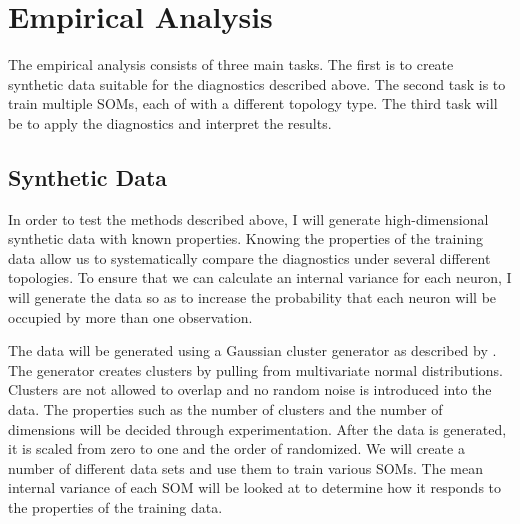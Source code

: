 \section{Empirical Analysis}
The empirical analysis consists of three main tasks.  The first is to create
synthetic data suitable for the diagnostics described above.  The second task is
to train multiple SOMs, each of with a different topology type. The third task
will be to apply the diagnostics and interpret the results.

\subsection{Synthetic Data}
In order to test the methods described above, I will generate high-dimensional
synthetic data with known properties.  Knowing the properties of the training
data allow us to systematically compare the diagnostics under several different
topologies.  To ensure that we can calculate an internal variance for each
neuron, I will generate the data so as to increase the probability that each
neuron will be occupied by more than one observation.

The data will be generated using a Gaussian cluster generator as described by
\cite{handl}. The generator creates clusters by pulling from multivariate
normal distributions.  Clusters are not allowed to overlap and no random noise
is introduced into the data.  The properties such as the number of clusters
and the number of dimensions will be decided through experimentation.  After
the data is generated, it is scaled from zero to one and the order of
randomized.  We will create a number of different data sets and use them to
train various SOMs.  The mean internal variance of each SOM will be looked at
to determine how it responds to the properties of the training data.

